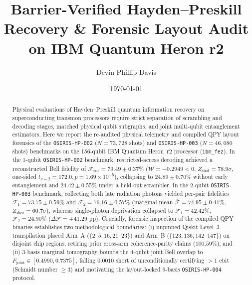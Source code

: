 \documentclass[aps,prxquantum,reprint,superscriptaddress,floatfix]{revtex4-2}
\begin{document}
\title{Barrier-Verified Hayden--Preskill Recovery \& Forensic Layout Audit on IBM Quantum Heron r2}

\author{Devin Phillip Davis}

\date{\today}

\begin{abstract}
Physical evaluations of Hayden--Preskill quantum information recovery on superconducting transmon processors require strict separation of scrambling and decoding stages, matched physical qubit subgraphs, and joint multi-qubit entanglement estimators. Here we report the re-audited physical telemetry and compiled QPY layout forensics of the \texttt{OSIRIS-HP-002} ($N = 73{,}728$ shots) and \texttt{OSIRIS-HP-003} ($N = 46{,}080$ shots) benchmarks on the 156-qubit IBM Quantum Heron~r2 processor (\texttt{ibm\_fez}). In the 1-qubit \texttt{OSIRIS-HP-002} benchmark, restricted-access decoding achieved a reconstructed Bell fidelity of $\mathcal{F}_{\mathrm{ent}} = \mathbf{79.49 \pm 0.37\%}$ ($\mathcal{W} = -0.2949 < 0$, $Z_{\mathrm{shot}} = 78.9\sigma$, one-sided $t_{\nu=2} = 172.0, p = 1.69 \times 10^{-5}$), collapsing to $24.89 \pm 0.70\%$ without early entanglement and $24.42 \pm 0.55\%$ under a held-out scrambler. In the 2-qubit \texttt{OSIRIS-HP-003} benchmark, collecting both late radiation photons yielded per-pair fidelities $\mathcal{F}_1 = 73.75 \pm 0.59\%$ and $\mathcal{F}_2 = 76.16 \pm 0.57\%$ (marginal mean $\bar{\mathcal{F}} = \mathbf{74.95 \pm 0.41\%}$, $Z_{\mathrm{shot}} = 60.7\sigma$), whereas single-photon deprivation collapsed to $\mathcal{F}_1 = 42.42\%$, $\mathcal{F}_2 = 24.90\%$ ($\Delta \bar{\mathcal{F}} = +41.29\text{ pp}$). Crucially, forensic inspection of the compiled QPY binaries establishes two methodological boundaries: (i) unpinned Qiskit Level~3 transpilation placed Arm~A ($\{2\text{--}5, 16, 21\text{--}23\}$) and Arm~B ($\{123, 136, 142\text{--}147\}$) on disjoint chip regions, retiring prior cross-arm coherence-parity claims ($100.59\%$); and (ii) 3-basis marginal tomography bounds the 4-qubit joint Bell overlap to $F_{\mathrm{joint}} \in [0.4990, 0.7375]$, falling $0.0010$ short of unconditionally certifying $>1\text{ ebit}$ (Schmidt number $\ge 3$) and motivating the layout-locked 9-basis \texttt{OSIRIS-HP-004} protocol.
\end{abstract}

\maketitle
\end{document}
